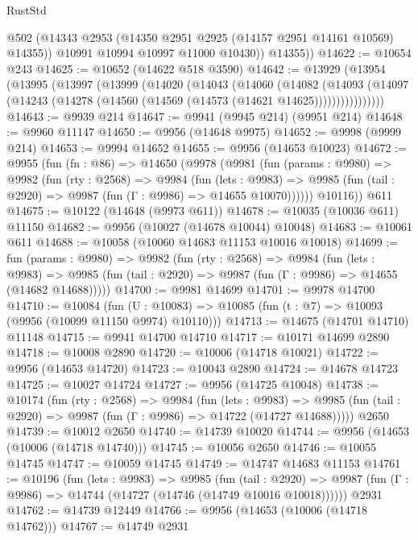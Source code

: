 \begin{lexlean}{RustStd}
\begin{coremodule}
            @502
            (@14343 @2953 (@14350 @2951 @2925 (@14157 @2951 @14161 @10569) @14355))
            @10991
            @10994
            @10997
            @11000
            @10430))
        @14355))
@14622 := @10654 @243
@14625 := @10652 (@14622 @518 @3590)
@14642 := @13929
    (@13954
      (@13995
        (@13997
          (@13999
            (@14020
              (@14043
                (@14060
                  (@14082
                    (@14093
                      (@14097 (@14243 (@14278 (@14560 (@14569 (@14573 (@14621 @14625))))))))))))))))
@14643 := @9939 @214
@14647 := @9941 (@9945 @214) (@9951 @214)
@14648 := @9960 @11147
@14650 := @9956 (@14648 @9975)
@14652 := @9998 (@9999 @214)
@14653 := @9994 @14652
@14655 := @9956 (@14653 @10023)
@14672 := @9955
    (fun (fn : @86) =>
    @14650
      (@9978
        (@9981
          (fun (params : @9980) =>
          @9982
            (fun (rty : @2568) =>
            @9984
              (fun (lets : @9983) =>
              @9985 (fun (tail : @2920) => @9987 (fun (Γ : @9986) => @14655 @10070))))))
        @10116))
    @611
@14675 := @10122 (@14648 (@9973 @611))
@14678 := @10035 (@10036 @611) @11150
@14682 := @9956 (@10027 (@14678 @10044) @10048)
@14683 := @10061 @611
@14688 := @10058 (@10060 @14683 @11153 @10016 @10018)
@14699 := fun (params : @9980) =>
  @9982
    (fun (rty : @2568) =>
    @9984
      (fun (lets : @9983) =>
      @9985 (fun (tail : @2920) => @9987 (fun (Γ : @9986) => @14655 (@14682 @14688)))))
@14700 := @9981 @14699
@14701 := @9978 @14700
@14710 := @10084
    (fun (U : @10083) => @10085 (fun (t : @7) => @10093 (@9956 (@10099 @11150 @9974) @10110)))
@14713 := @14675 (@14701 @14710) @11148
@14715 := @9941 @14700 @14710
@14717 := @10171 @14699 @2890
@14718 := @10008 @2890
@14720 := @10006 (@14718 @10021)
@14722 := @9956 (@14653 @14720)
@14723 := @10043 @2890
@14724 := @14678 @14723
@14725 := @10027 @14724
@14727 := @9956 (@14725 @10048)
@14738 := @10174
    (fun (rty : @2568) =>
    @9984
      (fun (lets : @9983) =>
      @9985 (fun (tail : @2920) => @9987 (fun (Γ : @9986) => @14722 (@14727 @14688)))))
    @2650
@14739 := @10012 @2650
@14740 := @14739 @10020
@14744 := @9956 (@14653 (@10006 (@14718 @14740)))
@14745 := @10056 @2650
@14746 := @10055 @14745
@14747 := @10059 @14745
@14749 := @14747 @14683 @11153
@14761 := @10196
    (fun (lets : @9983) =>
    @9985
      (fun (tail : @2920) =>
      @9987 (fun (Γ : @9986) => @14744 (@14727 (@14746 (@14749 @10016 @10018))))))
    @2931
@14762 := @14739 @12449
@14766 := @9956 (@14653 (@10006 (@14718 @14762)))
@14767 := @14749 @2931

\end{coremodule}
\end{lexlean}

